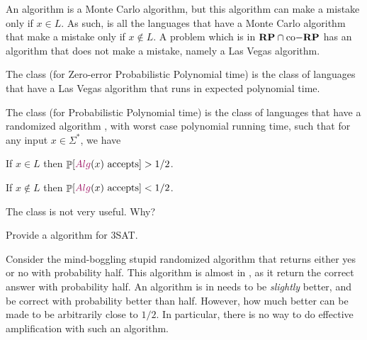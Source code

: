 An  algorithm is a Monte Carlo algorithm, but this
algorithm can make a mistake only if $x \in L$. As such, 
is all the languages that have a Monte Carlo algorithm that make a
mistake only if $x \notin L$. A problem which is in $\mathbf{RP} \cap
\mathrm{co-}\mathbf{RP}$ has an algorithm that does not make a mistake, namely a
Las Vegas algorithm.

\begin{defn}
    The class  (for Zero-error Probabilistic Polynomial
    time) is the class of languages that have a Las Vegas algorithm
    that runs in expected polynomial time.
\end{defn}


\begin{defn}
    The class \CClassPP (for Probabilistic Polynomial time) is the
    class of languages that have a randomized algorithm \Alg, with
    worst case polynomial running time, such that for any input
    $x \in \Sigma^*$, we have
    \begin{compactenumi}
        \item If $x \in L$ then $\Prob{\MakeBig \Alg(x) \text{
              accepts}} > 1/2$.
     
        \item If $x \notin L$ then $\Prob{\MakeBig\Alg(x) \text{
              accepts}} < 1/2$.
    \end{compactenumi}
\end{defn}

The class \CClassPP is not very useful. Why?

\begin{exercise}
    Provide a \CClassPP algorithm for 3SAT.
\end{exercise}

Consider the mind-boggling stupid randomized algorithm that returns
either yes or no with probability half. This algorithm is almost in
\CClassPP, as it return the correct answer with probability half. An
algorithm is in \CClassPP needs to be \emph{slightly} better, and be
correct with probability better than half. However, how much better
can be made to be arbitrarily close to $1/2$. In particular, there is
no way to do effective amplification with such an algorithm.


